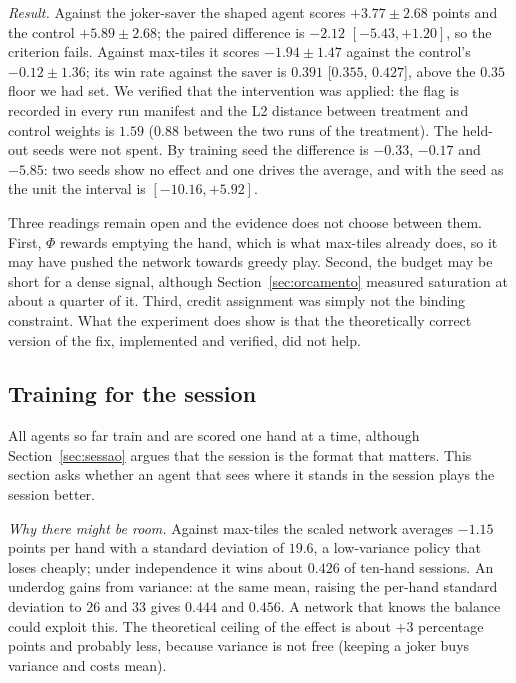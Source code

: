 \documentclass[11pt]{article}
\begin{document}
\emph{Result.} Against the joker-saver the shaped agent scores $+3.77\pm2.68$ points and the control $+5.89\pm2.68$; the paired difference is $-2.12$ $[-5.43,+1.20]$, so the criterion fails. Against max-tiles it scores $-1.94\pm1.47$ against the control's $-0.12\pm1.36$; its win rate against the saver is $0.391$ [$0.355$, $0.427$], above the $0.35$ floor we had set. We verified that the intervention was applied: the flag is recorded in every run manifest and the L2 distance between treatment and control weights is $1.59$ ($0.88$ between the two runs of the treatment). The held-out seeds were not spent. By training seed the difference is $-0.33$, $-0.17$ and $-5.85$: two seeds show no effect and one drives the average, and with the seed as the unit the interval is $[-10.16,+5.92]$.

Three readings remain open and the evidence does not choose between them. First, $\Phi$ rewards emptying the hand, which is what max-tiles already does, so it may have pushed the network towards greedy play. Second, the budget may be short for a dense signal, although Section~\ref{sec:orcamento} measured saturation at about a quarter of it. Third, credit assignment was simply not the binding constraint. What the experiment does show is that the theoretically correct version of the fix, implemented and verified, did not help.

\subsection{Training for the session}\label{sec:sessrl}
All agents so far train and are scored one hand at a time, although Section~\ref{sec:sessao} argues that the session is the format that matters. This section asks whether an agent that sees where it stands in the session plays the session better.

\emph{Why there might be room.} Against max-tiles the scaled network averages $-1.15$ points per hand with a standard deviation of $19.6$, a low-variance policy that loses cheaply; under independence it wins about $0.426$ of ten-hand sessions. An underdog gains from variance: at the same mean, raising the per-hand standard deviation to $26$ and $33$ gives $0.444$ and $0.456$. A network that knows the balance could exploit this. The theoretical ceiling of the effect is about $+3$ percentage points and probably less, because variance is not free (keeping a joker buys variance and costs mean).
\end{document}

